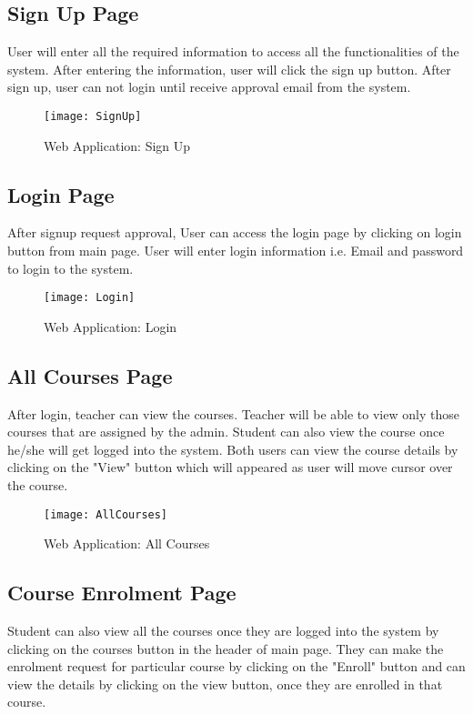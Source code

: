 \subsection{Sign Up Page}
User will enter all the required information to access all the functionalities of the system. After entering the information, user will click the sign up button. After sign up, user can not login until receive approval email from the system.

\begin{figure}[h]
  \centering
  \texttt{[image: SignUp]}
  \caption{Web Application: Sign Up}
\end{figure}

\subsection{Login Page}
After signup request approval, User can access the login page by clicking on login button from main page.  User will enter login information i.e. Email and password to login to the system.

\begin{figure}[h]
  \centering
  \texttt{[image: Login]}
  \caption{Web Application: Login}
\end{figure}

\subsection{All Courses Page}
After login, teacher can view the courses. Teacher will be able to view only those courses that are assigned by the admin. Student can also view the course once he/she will get logged into the system. Both users can view the course details by clicking on the "View" button which will appeared as user will move cursor over the course.

\begin{figure}[h]
  \centering
  \texttt{[image: AllCourses]}
  \caption{Web Application: All Courses}
\end{figure}

\subsection{Course Enrolment Page}
Student can also view all the courses once they are logged into the system by clicking on the courses button in the header of main page. They can make the enrolment request for particular course by clicking on the "Enroll" button and can view the details by clicking on the view button, once they are enrolled in that course.

